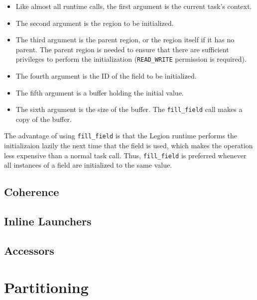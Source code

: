 \documentclass[11pt]{book}
\begin{document}
\begin{itemize}

\item Like almost all runtime calls, the first argument is the current task's context.

\item The second argument is the region to be initialized.

\item The third argument is the parent region, or the region itself if it has no parent.  The parent region is needed
to ensure that there are sufficient privileges to perform the initialization ({\tt READ\_WRITE} permission
is required).

\item The fourth argument is the ID of the field to be initialized.

\item The fifth argument is a buffer holding the initial value.

\item The sixth argument is the size of the buffer.  
The {\tt fill\_field} call makes a copy of the buffer.

\end{itemize}

The advantage of using {\tt fill\_field} is that the Legion runtime performs the initializaion lazily the next time that
the field is used, which makes the operation less expensive than a normal task call.  Thus, {\tt fill\_field} is preferred
whenever all instances of a field are initialized to the same value.


\section{Coherence}
\label{sec:coherence}

\section{Inline Launchers}
\label{sec:inlinelaunch}

\section{Accessors}
\label{sec:accessors}

\chapter{Partitioning}
\label{chap:partitioning}
\end{document}
